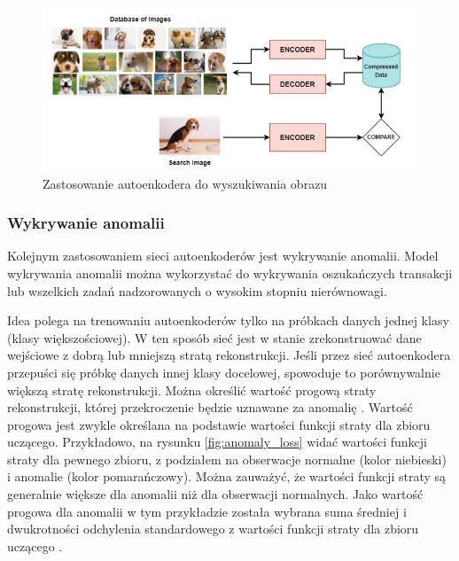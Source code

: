 \documentclass[12pt]{mwbk}
\theoremstyle{plain}
\theoremstyle{definition}
\theoremstyle{remark}
\newcommand\zrodlo[1]{\par\vspace{-3mm}{\small\textit{Źródło: }#1 }}
\begin{document}
\begin{figure}[!h]
	\centering
	\includegraphics[width=\linewidth]{rys/image_search.png}
	\caption{Zastosowanie autoenkodera do wyszukiwania obrazu}
	\zrodlo{\cite{kumar}}
	\label{fig:image-search}
\end{figure}

\newpage

\subsubsection{Wykrywanie anomalii}

Kolejnym zastosowaniem sieci autoenkoderów jest wykrywanie anomalii. Model wykrywania anomalii można wykorzystać do wykrywania oszukańczych transakcji lub wszelkich zadań nadzorowanych o wysokim stopniu nierównowagi.

 Idea polega na trenowaniu autoenkoderów tylko na próbkach danych jednej klasy (klasy większościowej). W ten sposób sieć jest w stanie zrekonstruować dane wejściowe z dobrą lub mniejszą stratą rekonstrukcji. Jeśli przez sieć autoenkodera przepuści się próbkę danych innej klasy docelowej, spowoduje to porównywalnie większą stratę rekonstrukcji. Można określić wartość progową straty rekonstrukcji, której przekroczenie będzie uznawane za anomalię \cite{kumar}. Wartość progowa jest zwykle określana na podstawie wartości funkcji straty dla zbioru uczącego. Przykładowo, na rysunku \ref{fig:anomaly_loss} widać wartości funkcji straty dla pewnego zbioru, z podziałem na obserwacje normalne (kolor niebieski) i anomalie (kolor pomarańczowy). Można zauważyć, że wartości funkcji straty są generalnie większe dla anomalii niż dla obserwacji normalnych. Jako wartość progowa dla anomalii w tym przykładzie została wybrana suma średniej i dwukrotności odchylenia standardowego z wartości funkcji straty dla zbioru uczącego \cite{agrawal}.
 
\end{document}

